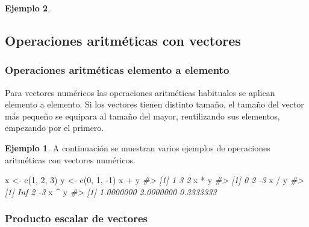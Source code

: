 \documentclass[
]{book}
\newenvironment{Shaded}{\begin{snugshade}}{\end{snugshade}}
\newcommand{\CommentTok}[1]{\textcolor[rgb]{0.56,0.35,0.01}{\textit{#1}}}
\newcommand{\DecValTok}[1]{\textcolor[rgb]{0.00,0.00,0.81}{#1}}
\newcommand{\FunctionTok}[1]{\textcolor[rgb]{0.00,0.00,0.00}{#1}}
\newcommand{\NormalTok}[1]{#1}
\newcommand{\OtherTok}[1]{\textcolor[rgb]{0.56,0.35,0.01}{#1}}
\newcommand{\SpecialCharTok}[1]{\textcolor[rgb]{0.00,0.00,0.00}{#1}}
\theoremstyle{definition}
\theoremstyle{definition}
\newtheorem{example}{Ejemplo}[chapter]
\theoremstyle{definition}
\theoremstyle{definition}
\theoremstyle{remark}
\begin{document}
\begin{example}
{\subsection{Operaciones aritméticas con vectores}\label{operaciones-aritmuxe9ticas-con-vectores}}

\hypertarget{operaciones-aritmuxe9ticas-elemento-a-elemento}{%
\subsubsection{Operaciones aritméticas elemento a elemento}\label{operaciones-aritmuxe9ticas-elemento-a-elemento}}

Para vectores numéricos las operaciones aritméticas habituales se aplican elemento a elemento. Si los vectores tienen distinto tamaño, el tamaño del vector más pequeño se equipara al tamaño del mayor, reutilizando sus elementos, empezando por el primero.

\begin{example}

A continuación se muestran varios ejemplos de operaciones aritméticas con vectores numéricos.

\begin{Shaded}
\begin{Highlighting}[]
\NormalTok{x }\OtherTok{\textless{}{-}} \FunctionTok{c}\NormalTok{(}\DecValTok{1}\NormalTok{, }\DecValTok{2}\NormalTok{, }\DecValTok{3}\NormalTok{)}
\NormalTok{y }\OtherTok{\textless{}{-}} \FunctionTok{c}\NormalTok{(}\DecValTok{0}\NormalTok{, }\DecValTok{1}\NormalTok{, }\SpecialCharTok{{-}}\DecValTok{1}\NormalTok{)}
\NormalTok{x }\SpecialCharTok{+}\NormalTok{ y}
\CommentTok{\#\textgreater{} [1] 1 3 2}
\NormalTok{x }\SpecialCharTok{*}\NormalTok{ y}
\CommentTok{\#\textgreater{} [1]  0  2 {-}3}
\NormalTok{x }\SpecialCharTok{/}\NormalTok{ y}
\CommentTok{\#\textgreater{} [1] Inf   2  {-}3}
\NormalTok{x }\SpecialCharTok{\^{}}\NormalTok{ y}
\CommentTok{\#\textgreater{} [1] 1.0000000 2.0000000 0.3333333}
\end{Highlighting}
\end{Shaded}

\end{example}

\hypertarget{producto-escalar-de-vectores}{%
\subsubsection{Producto escalar de vectores}\label{producto-escalar-de-vectores}}


\end{example}
\end{document}
